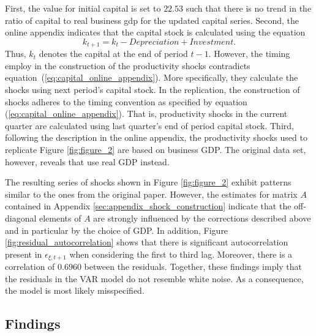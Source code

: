 First, the value for initial capital is set to $22.53$ such that there is no trend in the ratio of capital to real business gdp for the updated capital series. Second, the online appendix indicates that the capital stock is calculated using the equation
\begin{equation} 
	\label{eq:capital_online_appendix}
	k_{t+1} = k_{t} - Depreciation + Investment.
\end{equation} 
Thus, ${k}_t$ denotes the capital at the end of period $t-1$. However, the timing \citeauthor{JERMANNfinancial} employ in the construction of the productivity shocks contradicts equation~(\ref{eq:capital_online_appendix}). More specifically, they calculate the shocks using next period's capital stock. In the replication, the construction of shocks adheres to the timing convention as specified by equation (\ref{eq:capital_online_appendix}). That is, productivity shocks in the current quarter are calculated using last quarter's end of period capital stock. Third, following the description in the online appendix, the productivity shocks used to replicate Figure \ref{fig:figure_2} are based on business GDP. The original data set, however, reveals that \citeauthor{JERMANNfinancial} use real GDP instead. 

The resulting series of shocks shown in Figure \ref{fig:figure_2} exhibit patterns similar to the ones from the original paper. However, the estimates for matrix $A$ contained in Appendix \ref{sec:appendix_shock_construction} indicate that the off-diagonal elements of $A$ are strongly influenced by the corrections described above and in particular by the choice of GDP. In addition, Figure \ref{fig:residual_autocorrelation} shows that there is significant autocorrelation present in ${\epsilon}_{\xi,t+1}$ when considering the first to third lag. Moreover, there is a correlation of $0.6960$ between the residuals. Together, these findings imply that the residuals in the VAR model do not resemble white noise. As a consequence, the model is most likely misspecified.


\subsection{Findings}
\label{sec:findings}



